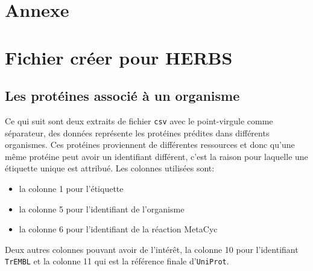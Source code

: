 \chapter{Annexe}

\chapter{Fichier créer pour HERBS}

\section{Les protéines associé à un organisme}

Ce qui suit sont deux extraits de fichier \texttt{csv} avec le point-virgule comme séparateur, des données représente les protéines prédites  dans différents organismes.
Ces protéines proviennent de différentes ressources et donc qu'une même protéine  peut avoir un identifiant différent, c'est la raison pour laquelle une étiquette unique est attribué. Les colonnes utilisées sont:
\begin{itemize}
	\item la colonne 1 pour l'étiquette
	\item la colonne 5 pour l'identifiant de l'organisme
	\item la colonne 6 pour l'identifiant de la réaction MetaCyc
\end{itemize}
 
 Deux autres colonnes pouvant avoir de l'intérêt, la colonne 10 pour l'identifiant \texttt{TrEMBL} et la colonne 11 qui est la référence finale d'\texttt{UniProt}.

